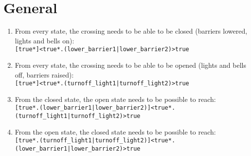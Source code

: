 \documentclass[final]{report}
\begin{document}
\section{General}

\begin{enumerate}
    \item From every state, the crossing needs to be able to be closed (barriers lowered, lights and bells on):\\
        \texttt{[true*]<true*.(lower\_barrier1|lower\_barrier2)>true}

    \item From every state, the crossing needs to be able to be opened (lights and bells off, barriers raised):\\
        \texttt{[true*]<true*.(turnoff\_light1|turnoff\_light2)>true}
        
     \item From the closed state, the open state needs to be possible to reach:\\    
     	\texttt{[true*.(lower\_barrier1|lower\_barrier2)]<true*.(turnoff\_light1|turnoff\_light2)>true}
     	
     \item From the open state, the closed state needs to be possible to reach:\\    
     \texttt{[true*.(turnoff\_light1|turnoff\_light2)]<true*.(lower\_barrier1|lower\_barrier2)>true}
\end{enumerate}
\end{document}
